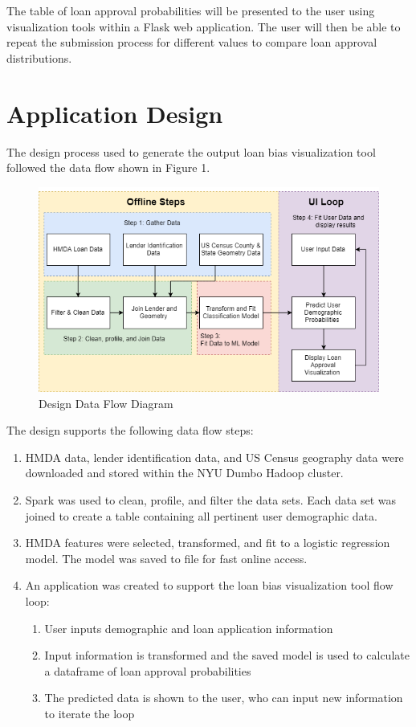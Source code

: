 \documentclass[conference,compsoc]{IEEEtran}
\begin{document}
The table of loan approval probabilities will be presented to the user using visualization tools within a Flask web application. The user will then be able to repeat the submission process for different values to compare loan approval distributions.   

\section{Application Design}

The design process used to generate the output loan bias visualization tool followed the data flow shown in Figure 1.


\begin{figure}[h!]
  \includegraphics[width=\linewidth]{SparkDesignDiagram.png}
  \caption{Design Data Flow Diagram}
  \label{fig:design}
\end{figure}


The design supports the following data flow steps:
\begin{enumerate}

\item HMDA data, lender identification data, and US Census geography data were downloaded and stored within the NYU Dumbo Hadoop cluster.

\item Spark was used to clean, profile, and filter the data sets. Each data set was joined to create a table containing all pertinent user demographic data.

\item HMDA features were selected, transformed, and fit to a logistic regression model. The model was saved to file for fast online access.

\item An application was created to support the loan bias visualization tool flow loop:

\begin{enumerate}
\item User inputs demographic and loan application information
\item Input information is transformed and the saved model is used to calculate a dataframe of loan approval probabilities
\item The predicted data is shown to the user, who can input new information to iterate the loop
\end{enumerate}

\end{enumerate}
\end{document}
